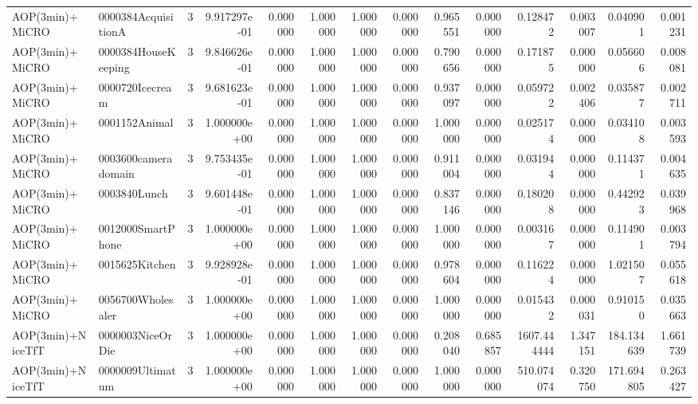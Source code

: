 \begin{tabular}{llrr|r|rr|rr|rr|rrr}
          AOP(3min)+MiCRO &    0000384AcquisitionA &       3 & 9.917297e-01 & 0.000000 & 1.000000 &      1.000000 & 0.000000 &      0.965551 & 0.000000 &      0.128472 &    0.003007 &     0.040901 &    0.001231 \\
          AOP(3min)+MiCRO &    0000384HouseKeeping &       3 & 9.846626e-01 & 0.000000 & 1.000000 &      1.000000 & 0.000000 &      0.790656 & 0.000000 &      0.171875 &    0.000000 &     0.056606 &    0.008081 \\
          AOP(3min)+MiCRO &        0000720Icecream &       3 & 9.681623e-01 & 0.000000 & 1.000000 &      1.000000 & 0.000000 &      0.937097 & 0.000000 &      0.059722 &    0.002406 &     0.035877 &    0.002711 \\
          AOP(3min)+MiCRO &          0001152Animal &       3 & 1.000000e+00 & 0.000000 & 1.000000 &      1.000000 & 0.000000 &      1.000000 & 0.000000 &      0.025174 &    0.000000 &     0.034108 &    0.003593 \\
          AOP(3min)+MiCRO &    0003600cameradomain &       3 & 9.753435e-01 & 0.000000 & 1.000000 &      1.000000 & 0.000000 &      0.911004 & 0.000000 &      0.031944 &    0.000000 &     0.114371 &    0.004635 \\
          AOP(3min)+MiCRO &           0003840Lunch &       3 & 9.601448e-01 & 0.000000 & 1.000000 &      1.000000 & 0.000000 &      0.837146 & 0.000000 &      0.180208 &    0.000000 &     0.442923 &    0.039968 \\
          AOP(3min)+MiCRO &      0012000SmartPhone &       3 & 1.000000e+00 & 0.000000 & 1.000000 &      1.000000 & 0.000000 &      1.000000 & 0.000000 &      0.003167 &    0.000000 &     0.114901 &    0.003794 \\
          AOP(3min)+MiCRO &         0015625Kitchen &       3 & 9.928928e-01 & 0.000000 & 1.000000 &      1.000000 & 0.000000 &      0.978604 & 0.000000 &      0.116224 &    0.000000 &     1.021507 &    0.055618 \\
          AOP(3min)+MiCRO &      0056700Wholesaler &       3 & 1.000000e+00 & 0.000000 & 1.000000 &      1.000000 & 0.000000 &      1.000000 & 0.000000 &      0.015432 &    0.000031 &     0.910150 &    0.035663 \\
        AOP(3min)+NiceTfT &       0000003NiceOrDie &       3 & 1.000000e+00 & 0.000000 & 1.000000 &      1.000000 & 0.000000 &      0.208040 & 0.685857 &   1607.444444 &    1.347151 &   184.134639 &    1.661739 \\
        AOP(3min)+NiceTfT &       0000009Ultimatum &       3 & 1.000000e+00 & 0.000000 & 1.000000 &      1.000000 & 0.000000 &      1.000000 & 0.000000 &    510.074074 &    0.320750 &   171.694805 &    0.263427 \\

\end{tabular}
